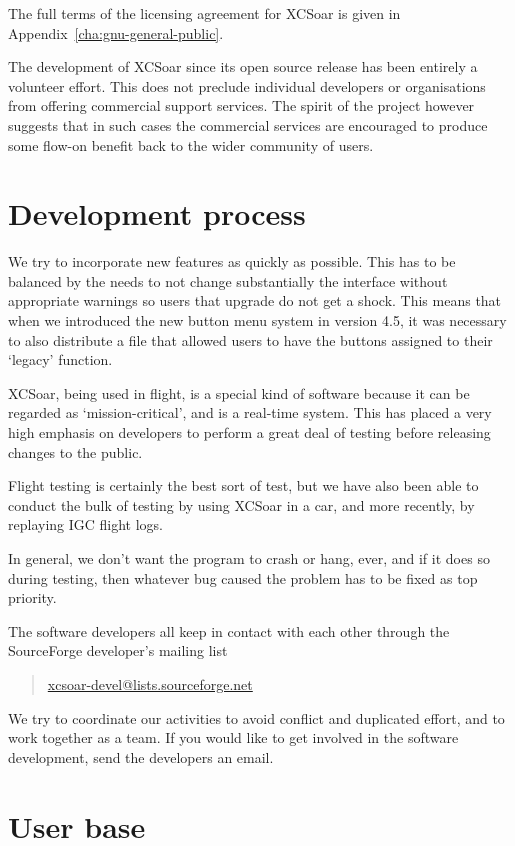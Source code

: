 The full terms of the licensing agreement for XCSoar is given in
Appendix~\ref{cha:gnu-general-public}.

The development of XCSoar since its open source release has been
entirely a volunteer effort.  This does not preclude individual
developers or organisations from offering commercial support services.
The spirit of the project however suggests that in such cases the
commercial services are encouraged to produce some flow-on benefit
back to the wider community of users.


\section{Development process}

We try to incorporate new features as quickly as possible.  This has
to be balanced by the needs to not change substantially the interface
without appropriate warnings so users that upgrade do not get a shock.
This means that when we introduced the new button menu system in
version 4.5, it was necessary to also distribute a file that allowed
users to have the buttons assigned to their `legacy' function.

XCSoar, being used in flight, is a special kind of software because it
can be regarded as `mission-critical', and is a real-time system.
This has placed a very high emphasis on developers to perform a great
deal of testing before releasing changes to the public.  

Flight testing is certainly the best sort of test, but we have also
been able to conduct the bulk of testing by using XCSoar in a car,
and more recently, by replaying IGC flight logs.

In general, we don't want the program to crash or hang, ever, and if
it does so during testing, then whatever bug caused the problem has to
be fixed as top priority.

The software developers all keep in contact with each other through
the SourceForge developer's mailing list
\begin{quote}
\url{xcsoar-devel@lists.sourceforge.net}
\end{quote}
We try to coordinate our activities to avoid conflict and duplicated
effort, and to work together as a team.  If you would like to get
involved in the software development, send the developers an email.


\section{User base}


